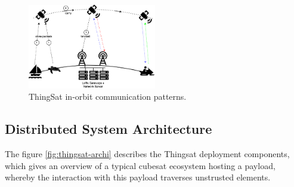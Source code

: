 \begin{figure}[t]
    \centering
    \includegraphics[width=0.5\textwidth]{Figures/thingsat-dtn.png}
    \caption{ThingSat in-orbit communication patterns.}
    \label{fig:thingsat-comm}
\end{figure}



\subsection{Distributed System Architecture}

The figure \ref{fig:thingsat-archi} describes the Thingsat deployment components, which gives an
overview of a typical cubesat ecosystem hosting a payload, whereby the interaction with this payload traverses unstrusted elements.

